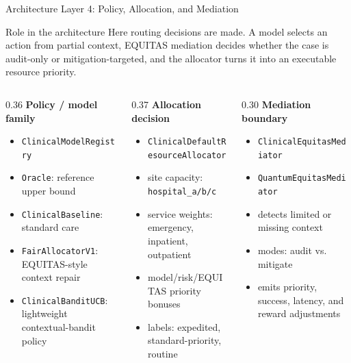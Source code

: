 \documentclass[aspectratio=169,10pt]{beamer}
\begin{document}
\begin{frame}{Architecture Layer 4: Policy, Allocation, and Mediation}
\small
\vspace{-0.2cm}
\begin{block}{Role in the architecture}
Here routing decisions are made. A model selects an action from partial context, EQUITAS mediation decides whether the case is audit-only or mitigation-targeted, and the allocator turns it into an executable resource priority.
\end{block}

\vspace{-0.1cm}

\begin{columns}[T]
\begin{column}{0.36\textwidth}
\textbf{\textcolor{phase4purple}{Policy / model family}}
\begin{itemize}
    \item \texttt{ClinicalModelRegistry}
    \item \texttt{Oracle}: reference upper bound
    \item \texttt{ClinicalBaseline}: standard care
    \item \texttt{FairAllocatorV1}: EQUITAS-style context repair
    \item \texttt{ClinicalBanditUCB}: lightweight contextual-bandit policy
\end{itemize}
\end{column}

\begin{column}{0.37\textwidth}
\textbf{\textcolor{phase4purple}{Allocation decision}}
\begin{itemize}
    \item \texttt{ClinicalDefaultResourceAllocator}
    \item site capacity: \texttt{hospital\_a/b/c}
    \item service weights: emergency, inpatient, outpatient
    \item model/risk/EQUITAS priority bonuses
    \item labels: expedited, standard-priority, routine
\end{itemize}
\end{column}

\begin{column}{0.30\textwidth}
\textbf{\textcolor{phase4purple}{Mediation boundary}}
\begin{itemize}
    \item \texttt{ClinicalEquitasMediator}
    \item \texttt{QuantumEquitasMediator}
    \item detects limited or missing context
    \item modes: audit vs. mitigate
    \item emits priority, success, latency, and reward adjustments
\end{itemize}
\end{column}
\end{columns}


\end{frame}
\end{document}
